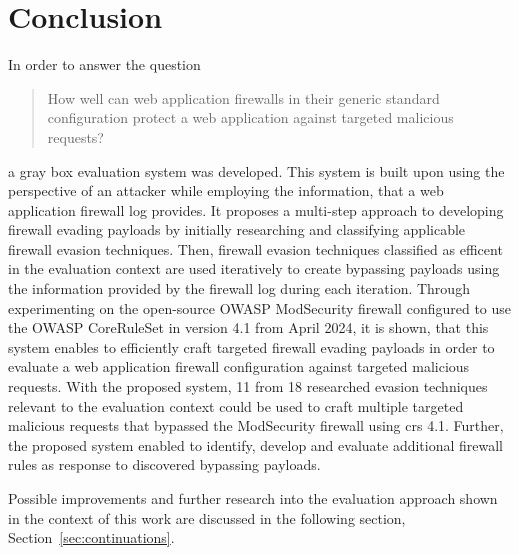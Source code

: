 \section{Conclusion}
\label{sec:conclusion}
In order to answer the question
\begin{quote}
	How well can web application firewalls in their generic standard configuration
	protect a web application against targeted malicious requests?
\end{quote}
a gray box evaluation system was developed.
This system is built upon using the perspective of an attacker while employing the information, that a web application firewall log provides.
It proposes a multi-step approach to developing firewall evading payloads by initially researching and classifying applicable firewall evasion techniques.
Then, firewall evasion techniques classified as efficent in the evaluation context are used iteratively to create bypassing payloads using the information provided by the firewall log during each iteration.
Through experimenting on the open-source OWASP ModSecurity firewall configured to use the OWASP CoreRuleSet in version 4.1 from April 2024, it is shown, that this system enables to efficiently craft targeted firewall evading payloads in order to evaluate a web application firewall configuration against targeted malicious requests.
With the proposed system, 11 from 18 researched evasion techniques relevant to the evaluation context could be used to craft multiple targeted malicious requests that bypassed the ModSecurity firewall using \acrshort{crs} 4.1.
Further, the proposed system enabled to identify, develop and evaluate additional firewall rules as response to discovered bypassing payloads.

Possible improvements and further research into the evaluation approach shown in the context of this work are discussed in the following section, Section~\ref{sec:continuations}.
